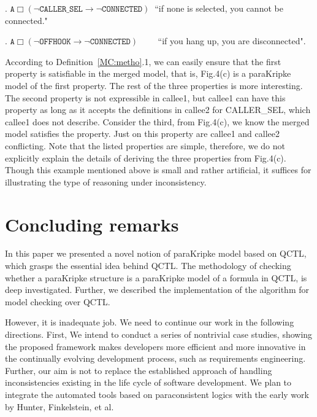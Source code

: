 \documentclass{entcs}
\begin{document}
.
$\texttt{A}\Box(\neg\texttt{CALLER\_SEL}\rightarrow\neg\texttt{CONNECTED})\
$ ``if none is selected, you cannot be connected."

 .
$\texttt{A}\Box(\neg\texttt{OFFHOOK}\rightarrow\neg\texttt{CONNECTED})\
\ \ \ \ \ \ \ \ $ ``if you hang up, you are disconnected".
\normalsize

According to Definition~\ref{MC:metho}.1, we can easily ensure
that the first property is satisfiable in the merged model, that
is, Fig.4(c) is a paraKripke model of the first property. The rest
of the three properties is more interesting. The second property
is not expressible in callee1, but callee1 can have this property
as long as it accepts the definitions in callee2 for CALLER\_SEL,
which callee1 does not describe. Consider the third, from
Fig.4(c), we know the merged model satisfies the property. Just on
this property are callee1 and callee2 conflicting. Note that the
listed properties are simple, therefore, we do not explicitly
explain the details of deriving the three properties from
Fig.4(c). Though this example mentioned above is small and rather
artificial, it suffices for illustrating the type of reasoning
under inconsistency.

\section{Concluding remarks}

In this paper we presented a novel notion of paraKripke model
based on QCTL, which grasps the essential idea behind QCTL. The
methodology of checking whether a paraKripke structure is a
paraKripke model of a formula in QCTL, is deep investigated.
Further, we described the implementation of the algorithm for
model checking over QCTL.

However, it is inadequate job. We need to continue our work in the
following directions. First, We intend to conduct a series of
nontrivial case studies, showing the proposed framework makes
developers more efficient and more innovative in the continually
evolving development process, such as requirements engineering.
Further, our aim is not to replace the established approach of
handling inconsistencies existing in the life cycle of software
development. We plan to integrate the automated tools based on
paraconsistent logics  with the early work by Hunter, Finkelstein,
et al.
\end{document}

